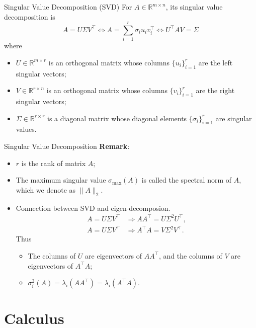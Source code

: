 \documentclass[10pt]{beamer}
\begin{document}
\begin{frame}{Singular Value Decomposition (SVD)}
    For $A \in \mathbb{R}^{m \times n}$, its singular value decomposition is 
    \[
        A = U\Sigma V^\top  \Leftrightarrow A = \sum_{i = 1}^r \sigma_i u_iv_i^\top \Leftrightarrow U^\top A V = \Sigma
    \]
    where 
    \begin{itemize}
        \item $U \in \mathbb{R}^{m \times r}$ is an orthogonal matrix whose columns $\{u_i\}_{i = 1}^r$ are the left singular vectors;
        \item $V \in \mathbb{R}^{r \times n}$ is an orthogonal matrix whose columns $\{v_i\}_{i = 1}^r$ are the right singular vectors;
        \item $\Sigma \in \mathbb{R}^{r \times r}$ is a diagonal matrix whose diagonal elements $\{\sigma_i\}_{i = 1}^r$ are singular values. 
    \end{itemize}
\end{frame}

\begin{frame}{Singular Value Decomposition}
    \textbf{Remark}:
    \begin{itemize}
        \item $r$ is the rank of matrix $A$;
        \item The maximum singular value $\sigma_{\max}(A)$ is called the spectral norm of $A$, which we denote as $\|A\|_2$. 
        \item Connection between SVD and eigen-decomposion. 
        \begin{align*}
            A = U\Sigma V^\top &\Rightarrow AA^\top = U\Sigma^2 U^\top, \\
             A = U\Sigma V^\top &\Rightarrow A^\top A = V\Sigma^2 V^\top.
        \end{align*}
        Thus 
            \begin{itemize}
                \item The columns of $U$ are eigenvectors of $AA^\top$, and the columns of $V$ are eigenvectors of $A^\top A$;
                \item $\sigma_i^2(A) = \lambda_i(AA^\top) = \lambda_i(A^\top A)$.
            \end{itemize}
    \end{itemize}
\end{frame}

\section{Calculus}
\end{document}
